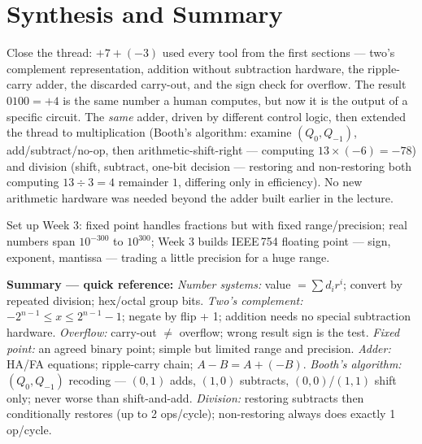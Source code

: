 \documentclass[11pt]{article}
\begin{document}
\section{Synthesis and Summary}

Close the thread: $+7 + (-3)$ used every tool from the first sections --- two's complement representation, addition without subtraction hardware, the ripple-carry adder, the discarded carry-out, and the sign check for overflow. The result $0100 = +4$ is the same number a human computes, but now it is the output of a specific circuit. The \emph{same} adder, driven by different control logic, then extended the thread to multiplication (Booth's algorithm: examine $(Q_0,Q_{-1})$, add/subtract/no-op, then arithmetic-shift-right --- computing $13\times(-6)=-78$) and division (shift, subtract, one-bit decision --- restoring and non-restoring both computing $13\div3=4$ remainder $1$, differing only in efficiency). No new arithmetic hardware was needed beyond the adder built earlier in the lecture.

Set up Week 3: fixed point handles fractions but with fixed range/precision; real numbers span $10^{-300}$ to $10^{300}$; Week 3 builds IEEE\,754 floating point --- sign, exponent, mantissa --- trading a little precision for a huge range.

\textbf{Summary --- quick reference:} \emph{Number systems:} value $= \sum d_i r^i$; convert by repeated division; hex/octal group bits. \emph{Two's complement:} $-2^{n-1} \le x \le 2^{n-1}-1$; negate by flip + 1; addition needs no special subtraction hardware. \emph{Overflow:} carry-out $\neq$ overflow; wrong result sign is the test. \emph{Fixed point:} an agreed binary point; simple but limited range and precision. \emph{Adder:} HA/FA equations; ripple-carry chain; $A-B = A+(-B)$. \emph{Booth's algorithm:} $(Q_0,Q_{-1})$ recoding --- $(0,1)$ adds, $(1,0)$ subtracts, $(0,0)$/$(1,1)$ shift only; never worse than shift-and-add. \emph{Division:} restoring subtracts then conditionally restores (up to 2 ops/cycle); non-restoring always does exactly 1 op/cycle.



\end{document}
